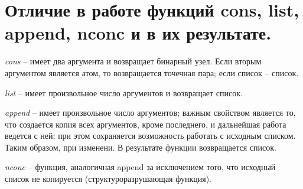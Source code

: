 \section{Отличие в работе функций cons, list, append, nconc и в их результате.}
\textit{cons} -- имеет два аргумента и возвращает бинарный узел. Если вторым аргументом является атом, то возвращается точечная пара; если список -- список.

\textit{list} -- имеет произвольное число аргументов и возвращает список.

\textit{append} -- имеет произвольное число аргументов; важным свойством является то, что создается копия всех аргументов, кроме последнего, и дальнейшая работа ведется с ней; при этом сохраняется возможность работать с исходным списком. Таким образом, при изменени. В результате функции возвращается список.

\textit{nconc} -- функция, аналогичная append за исключением того, что исходный список не копируется (структуроразрушающая функция).
